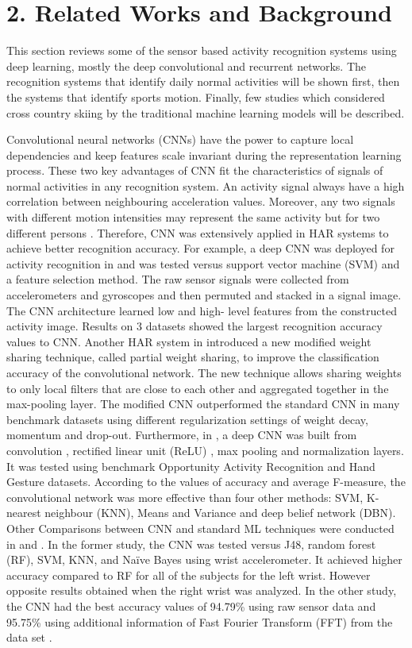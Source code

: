 \documentclass[12pt,a4paper]{article}
\begin{document}
\section*{2. Related Works and Background} \label{sec:RWAB}

This section reviews some of the sensor based activity recognition systems using deep learning, mostly the deep convolutional and recurrent networks. The recognition systems that identify daily normal activities will be shown first, then the systems that identify sports motion. Finally, few studies which considered cross country skiing by the traditional machine learning models will be described.

Convolutional neural networks (CNNs) have the power to capture local dependencies and keep features scale invariant during the representation learning process. These two key advantages of CNN fit the characteristics of signals of normal activities in any recognition system. An activity signal always have a high correlation between neighbouring acceleration values. Moreover, any two signals with different motion intensities may represent the same activity but for two different persons \cite{zeng2014convolutional}. Therefore, CNN was extensively applied in HAR systems to achieve better recognition accuracy.  For example, a deep CNN was deployed for activity recognition in \cite{jiang2015human} and was tested versus support vector machine (SVM) and a feature selection method. The raw sensor signals were collected from accelerometers and gyroscopes and then permuted and stacked in a signal image. The CNN architecture learned low and high- level features from the constructed activity image. Results on 3 datasets showed the largest recognition accuracy values to CNN. Another HAR system in \cite{zeng2014convolutional} introduced a new modified weight sharing technique, called partial weight sharing, to improve the classification accuracy of the convolutional network. The new technique allows sharing weights to only local filters that are close to each other and aggregated together in the max-pooling layer. The modified CNN outperformed the standard CNN in many benchmark datasets using different regularization settings of weight decay, momentum and drop-out. Furthermore, in \cite{yang2015deep}, a deep CNN was built from  convolution , rectified linear unit (ReLU) , max pooling  and  normalization layers. It was tested using benchmark Opportunity Activity Recognition  and Hand Gesture datasets. According to the values of accuracy and average F-measure, the convolutional network was more effective than four other methods: SVM, K-nearest neighbour (KNN), Means and Variance and deep belief network (DBN).  Other Comparisons between CNN and standard ML techniques were conducted in \cite{gjoreskicomparing} and  \cite{ronao2016human}. In the former study, the CNN was tested versus J48, random forest (RF), SVM, KNN, and Naïve Bayes using wrist accelerometer. It achieved higher accuracy compared to RF for all of the subjects for the left wrist. However opposite results obtained when the right wrist was analyzed. In the other study, the CNN had the best accuracy values of 94.79\% using raw sensor data and 95.75\% using additional information of Fast Fourier Transform (FFT) from the data set . 
\end{document}
